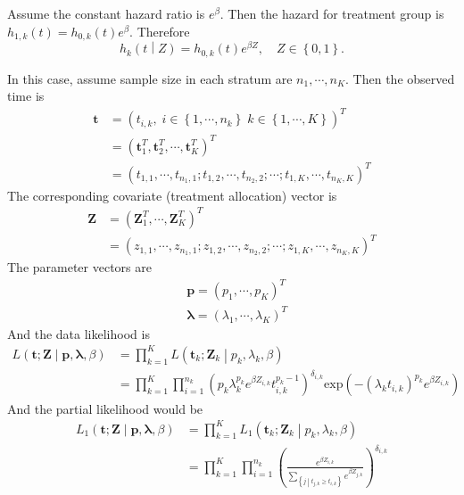 \documentclass[a4paper,12pt]{article}
\begin{document}
Assume the constant hazard ratio is $e^\beta$. Then the hazard for treatment group is $h_{1, k}\left(t\right) = h_{0, k}\left(t\right)e^\beta$. Therefore
\[
  h_k\left(t\middle|Z\right) = h_{0, k}\left(t\right)e^{\beta Z},\quad Z\in\left\{0, 1\right\}. 
\]

In this case, assume sample size in each stratum are $n_1, \cdots, n_K$. Then the observed time is
\[
  \begin{aligned}
    \bm{t}
    &=
      \left(
      t_{i,k}
      ,\;
      i\in\left\{1, \cdots, n_k\right\}
      \;
      k\in\left\{1, \cdots, K\right\}
      \right)^T    \\
    &= \left(
      \bm{t}_1^T, \bm{t}_2^T, \cdots, \bm{t}_K^T
      \right)^T    \\
    &= \left(
      t_{1, 1}, \cdots, t_{n_1, 1};
      t_{1, 2}, \cdots, t_{n_2, 2};
      \cdots ;
      t_{1, K}, \cdots, t_{n_K, K}
      \right)^T
  \end{aligned} 
\]
The corresponding covariate (treatment allocation) vector is
\[
  \begin{aligned}
    \bm{Z}
    &= \left(
      \bm{Z}_1^T, \cdots, \bm{Z}_K^T
      \right)^T    \\
    &= \left(
      z_{1, 1}, \cdots, z_{n_1, 1};
      z_{1, 2}, \cdots, z_{n_2, 2};
      \cdots ;
      z_{1, K}, \cdots, z_{n_K, K}
      \right)^T
  \end{aligned}
\]
The parameter vectors are
\[
  \begin{aligned}
    & \bm{p} = \left(p_1, \cdots, p_K\right)^T    \\
    & \bm{\lambda} = \left(\lambda_1, \cdots, \lambda_K\right)^T
  \end{aligned}
\]
And the data likelihood is
\[
  \begin{aligned}
    L\left(
    \bm{t}; \bm{Z}
    \middle|
    \bm{p}, \bm{\lambda}, \beta
    \right)
    &= \prod\limits_{k = 1}^K
      L\left(\bm{t}_k; \bm{Z}_k\middle| p_k, \lambda_k, \beta\right)    \\
    &= \prod\limits_{k = 1}^K\prod\limits_{i = 1}^{n_k}
      \left(
      p_k\lambda_k^{p_k}e^{\beta Z_{i, k}}t_{i, k}^{p_k - 1}
      \right)^{\delta_{i, k}}
      \mathrm{exp}\left(
      - \left(\lambda_k t_{i, k}\right)^{p_k}
      e^{\beta Z_{i, k}}
      \right)
  \end{aligned}
\]
And the partial likelihood would be
\[
  \begin{aligned}
    L_1\left(\bm{t}; \bm{Z}\middle|\bm{p}, \bm{\lambda}, \beta\right)
    &= \prod\limits_{k = 1}^KL_1\left(\bm{t}_k; \bm{Z}_k\middle| p_k, \lambda_k, \beta\right)    \\
    &= \prod\limits_{k = 1}^K\prod\limits_{i = 1}^{n_k}
      \left(
      \frac{
      e^{\beta Z_{i, k}}}{
      \sum\limits_{\left\{j\middle|t_{j, k}\geq t_{i, k}\right\}}e^{\beta Z_{j, k}}}
      \right)^{\delta_{i, k}}
  \end{aligned}
\]
\end{document}
